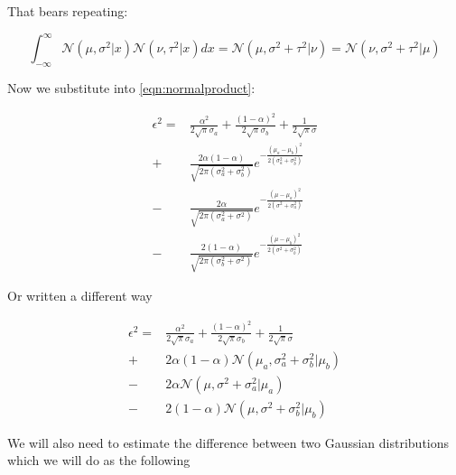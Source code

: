 \documentclass{article}
\begin{document}
That bears repeating:

\begin{equation}
    \int_{-\infty}^\infty \mathcal{N}(\mu, \sigma^2|x) \mathcal{N}(\nu, \tau^2|x) dx = \mathcal{N}(\mu, \sigma^2+\tau^2| \nu) = \mathcal{N}(\nu, \sigma^2+\tau^2|\mu)
\end{equation}


Now we substitute into \ref{eqn:normalproduct}:

\begin{equation}
\begin{aligned}
    \epsilon^2 = & \frac{ \alpha^2}{2\sqrt{\pi}\sigma_a} 
                + \frac{(1-\alpha)^2}{2\sqrt{\pi}\sigma_b} 
                + \frac{1}{2\sqrt{\pi}\sigma} \\
                + & \frac{2\alpha(1-\alpha)}{\sqrt{2\pi\left( \sigma_a^2 + \sigma_b^2 \right)}} e^{-\frac{(\mu_a-\mu_b)^2}{2(\sigma_a^2+\sigma_b^2)}}  \\
                - & \frac{2\alpha}{\sqrt{2\pi\left( \sigma_a^2 + \sigma^2 \right)}} e^{-\frac{(\mu - \mu_a)^2}{2(\sigma^2 + \sigma_a^2)}}  \\
                - & \frac{2(1-\alpha)}{\sqrt{2\pi\left( \sigma_b^2 + \sigma^2 \right)}} e^{-\frac{(\mu - \mu_b)^2}{2(\sigma^2 + \sigma_b^2)}} 
\end{aligned}
\end{equation}

Or written a different way

\begin{equation}
\begin{aligned}
    \epsilon^2 = & \frac{ \alpha^2}{2\sqrt{\pi}\sigma_a} 
                + \frac{(1-\alpha)^2}{2\sqrt{\pi}\sigma_b} 
                + \frac{1}{2\sqrt{\pi}\sigma} \\
                + & 2\alpha(1-\alpha)\mathcal{N}(\mu_a, \sigma_a^2+\sigma_b^2|\mu_b)  \\
                - & 2\alpha \mathcal{N}(\mu, \sigma^2+\sigma_a^2|\mu_a)  \\
                - & 2(1-\alpha)\mathcal{N}(\mu, \sigma^2+\sigma_b^2|\mu_b) 
\end{aligned}
\end{equation}

We will also need to estimate the difference between two Gaussian distributions which we will do as the following
\end{document}
